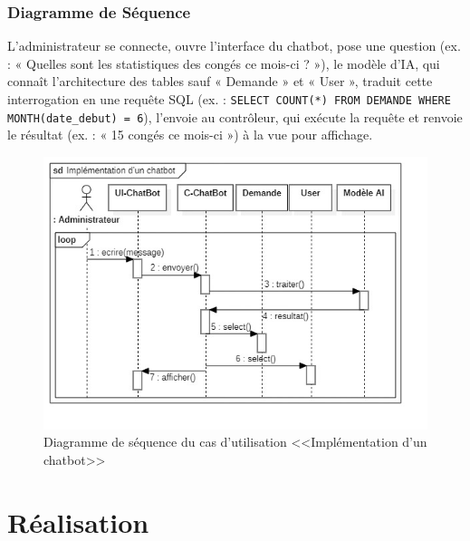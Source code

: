 \subsubsection{Diagramme de Séquence}
L’administrateur se connecte, ouvre l’interface du chatbot, pose une question (ex. : « Quelles sont les statistiques des congés ce mois-ci ? »), le modèle d’IA, qui connaît l’architecture des tables sauf « Demande » et « User », traduit cette interrogation en une requête SQL (ex. : \texttt{SELECT COUNT(*) FROM DEMANDE WHERE MONTH(date\_debut) = 6}), l’envoie au contrôleur, qui exécute la requête et renvoie le résultat (ex. : « 15 congés ce mois-ci ») à la vue pour affichage.
\begin{figure}[h]
    \centering
    \includegraphics[width=13cm]{images/C_chatbot.jpg}
    \caption{Diagramme de séquence du cas d'utilisation <<Implémentation d’un chatbot>>}
    \label{fig:seq_implement_chatbot}
\end{figure}
\section{Réalisation}

